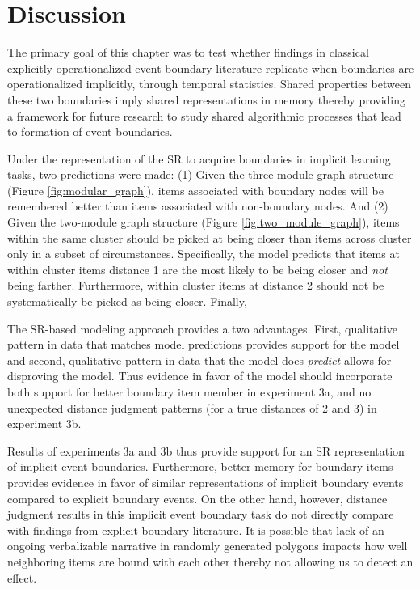 \section{Discussion}

The primary goal of this chapter was to test whether findings in classical explicitly operationalized event boundary literature replicate when boundaries are operationalized implicitly, through temporal statistics. Shared properties between these two boundaries imply shared representations in memory thereby providing a framework for future research to study shared algorithmic processes that lead to formation of event boundaries. 

Under the representation of the SR to acquire boundaries in implicit learning tasks, two predictions were made: (1) Given the three-module graph structure (Figure \ref{fig:modular_graph}), items associated with boundary nodes will be remembered better than items associated with non-boundary nodes. And (2) Given the two-module graph structure (Figure \ref{fig:two_module_graph}), items within the same cluster should be picked at being closer than items across cluster only in a subset of circumstances. Specifically, the model predicts that items at within cluster items distance 1 are the most likely to be being closer and \textit{not} being farther. Furthermore, within cluster items at distance 2 should not be systematically be picked as being closer. Finally, 

The SR-based modeling approach provides a two advantages. First, qualitative pattern in data that matches model predictions provides support for the model and second, qualitative pattern in data that the model does \textit{predict} allows for disproving the model. Thus evidence in favor of the model should incorporate both support for better boundary item member in experiment 3a, and no unexpected distance judgment patterns (for a true distances of 2 and 3) in experiment 3b.

Results of experiments 3a and 3b thus provide support for an SR representation of implicit event boundaries. Furthermore, better memory for boundary items provides evidence in favor of similar representations of implicit boundary events compared to explicit boundary events. On the other hand, however, distance judgment results in this implicit event boundary task do not directly compare with findings from explicit boundary literature. It is possible that lack of an ongoing verbalizable narrative in randomly generated polygons impacts how well neighboring items are bound with each other thereby not allowing us to detect an effect.

